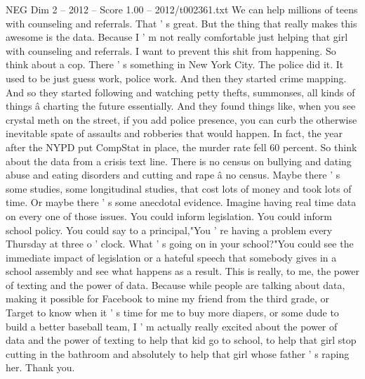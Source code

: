 \begin{textsample}{NEG Dim 2 – 2012 – Score 1.00 – 2012/t002361.txt}
We can help millions of teens with counseling and referrals.
That ' s great.
But the thing that really makes this awesome is the data.
Because I ' m not really comfortable just helping that girl with counseling and referrals.
I want to prevent this shit from happening.
So think about a cop.
There ' s something in New York City.
The police did it.
It used to be just guess work, police work.
And then they started crime mapping.
And so they started following and watching petty thefts, summonses, all kinds of things â charting the future essentially.
And they found things like, when you see crystal meth on the street, if you add police presence, you can curb the otherwise inevitable spate of assaults and robberies that would happen.
In fact, the year after the NYPD put CompStat in place, the murder rate fell 60 percent.
So think about the data from a crisis text line.
There is no census on bullying and dating abuse and eating disorders and cutting and rape â no census.
Maybe there ' s some studies, some longitudinal studies, that cost lots of money and took lots of time.
Or maybe there ' s some anecdotal evidence.
Imagine having real time data on every one of those issues.
You could inform legislation.
You could inform school policy.
You could say to a principal,"You ' re having a problem every Thursday at three o ' clock.
What ' s going on in your school?"You could see the immediate impact of legislation or a hateful speech that somebody gives in a school assembly and see what happens as a result.
This is really, to me, the power of texting and the power of data.
Because while people are talking about data, making it possible for Facebook to mine my friend from the third grade, or Target to know when it ' s time for me to buy more diapers, or some dude to build a better baseball team, I ' m actually really excited about the power of data and the power of texting to help that kid go to school, to help that girl stop cutting in the bathroom and absolutely to help that girl whose father ' s raping her.
Thank you.

\end{textsample}
